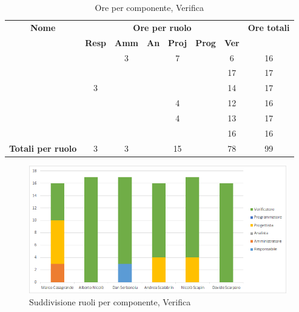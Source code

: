 \begin{table}[H]
	\begin{center}
		\begin{tabular}{|c|c|c|c|c|c|c|c|}
			\hline
			\textbf{Nome} & \multicolumn{6}{c|}{\textbf{Ore per ruolo}} & \textbf{Ore totali} \\\cline{2-7}
			& \textbf{Resp} & \textbf{Amm} & \textbf{An} & \textbf{Proj} & \textbf{Prog} & \textbf{Ver} & \\
			\hline
			\MC			&		&	3	&		&	7	&		&	6	&	16	\\
			\hline
			\AN			&		&		&		&	 	&		&	17	& 	17	\\
			\hline
			\DAN		&	3	&		&		&		&		&	14	&	17	\\
			\hline
			\AS			&		&	 	&	 	&	4	&	 	& 	12	&	16	\\
			\hline
			\NS 		&		&		&		&	4	&		& 	13	&	17	\\
			\hline
			\DS			& 		&		&		&		&		&	16	&	16	\\
			\hline
			\textbf{Totali per ruolo}	& 	3	&	3	&		&  15	&		&	78	&	99	\\
			\hline
		\end{tabular}
	\end{center}
	\caption{Ore per componente, Verifica}
\end{table}

\begin{figure}[H]
	\centering
	\includegraphics[scale=0.6]{img/6-5.png}
	\caption{Suddivisione ruoli per componente, Verifica}
\end{figure}

